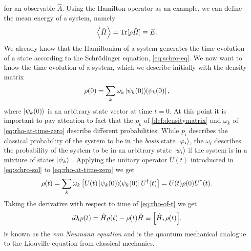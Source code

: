 \documentclass{book}
\numberwithin{equation}{section} %
\begin{document}
for an observable $\hat{A}$.
Using the Hamilton operator as an example, we can define the mean energy of a system, namely
\begin{align}
    \expval{\hat{H}} = \Trace[\rho \hat{H}]\equiv E.
\end{align}
We already know that the Hamiltonian of a system generates the time evolution of a state according to the Schrödinger equation,
\cref{eq:schro-eq}.
We now want to know the time evolution of a system, which we describe initially with the density matrix
\begin{align}\label{eq:rho-at-time-zero}
    \rho(0) = \sum\limits_k \omega_k \dyad{\psi_k(0)},
\end{align}
where $\ket{\psi_k(0)}$ is an arbitrary state vector at time $t=0$.
At this point it is important to pay attention to fact that the $p_k$ of \cref{def:densitymatrix} and $\omega_k$ of \cref{eq:rho-at-time-zero}
describe different probabilities. While $p_i$ describes the classical probability of the system to be in the \emph{basis} state
$\ket{\varphi_i}$, the $\omega_i$ describes the probability of the system to be in an arbitrary state $\ket{\psi_i}$ if the system is
in a mixture of states $\ket{\psi_k}$ \cite{BA_messiah2014quantum, BA_breuer2002theory}.
Applying the unitary operator $U(t)$ introducted in \cref{eq:schro-sol} to \cref{eq:rho-at-time-zero} we get
\begin{align}\label{eq:rho-of-t}
    \rho(t) = \sum\limits_k \omega_k \left[U(t)\dyad{\psi_k(0)}U^\dagger(t)\right] = U(t) \rho(0) U^\dagger(t).
\end{align}
Taking the derivative with respect to time of \cref{eq:rho-of-t} we get
\begin{align}\label{eq:vn-eq}
    i\partial_t \rho(t) = \hat{H}\rho(t) - \rho(t) \hat{H} \equiv \comm{\hat{H}}{\rho(t)}.
\end{align}
 is known as the \emph{von Neumann equation} and is the quantum mechanical analogue to the Liouville equation
from classical mechanics.
\end{document}
